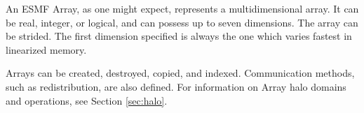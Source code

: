 

An ESMF Array, as one might expect, represents a multidimensional array.
It can be real, integer, or logical, and can possess up to seven 
dimensions.  The array can be strided.  The first dimension specified 
is always the one which varies fastest in linearized memory. 

Arrays can be created, destroyed, copied, and indexed.  Communication
methods, such as redistribution, are also defined.  For information on 
Array halo domains and operations, see Section \ref{sec:halo}.
